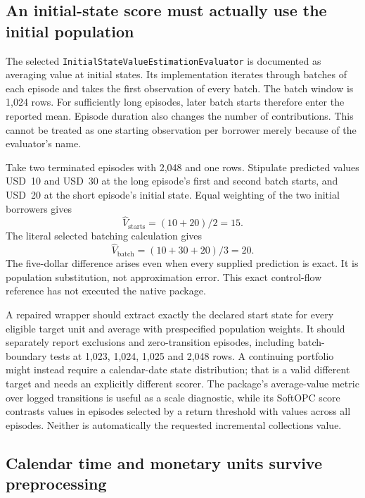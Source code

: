 \subsection{An initial-state score must actually use the initial population}

The selected \texttt{InitialStateValueEstimationEvaluator} is documented as
averaging value at initial states. Its implementation iterates through batches
of each episode and takes the first observation of every batch. The batch
window is 1,024 rows. For sufficiently long episodes, later batch starts
therefore enter the reported mean. Episode duration also changes the number
of contributions. This cannot be treated as one starting observation per
borrower merely because of the evaluator's name.
\citep{exec15_d3rlpy_value}

Take two terminated episodes with 2,048 and one rows. Stipulate predicted
values USD~10 and USD~30 at the long episode's first and second batch starts,
and USD~20 at the short episode's initial state. Equal weighting of the two
initial borrowers gives
\[
   \widehat V_{\mathrm{starts}}=(10+20)/2=15.
\]
The literal selected batching calculation gives
\[
   \widehat V_{\mathrm{batch}}=(10+30+20)/3=20.
\]
The five-dollar difference arises even when every supplied prediction is
exact. It is population substitution, not approximation error. This exact
control-flow reference has not executed the native package.
\citep{exec15_d3rlpy_exact}

A repaired wrapper should extract exactly the declared start state for every
eligible target unit and average with prespecified population weights. It
should separately report exclusions and zero-transition episodes, including
batch-boundary tests at 1,023, 1,024, 1,025 and 2,048 rows. A continuing
portfolio might instead require a calendar-date state distribution; that is
a valid different target and needs an explicitly different scorer. The
package's average-value metric over logged transitions is useful as a scale
diagnostic, while its SoftOPC score contrasts values in episodes selected by
a return threshold with values across all episodes. Neither is automatically
the requested incremental collections value.
\citep{exec15_d3rlpy_value,exec15_d3rlpy_contract}

\subsection{Calendar time and monetary units survive preprocessing}

